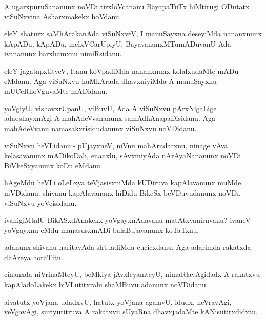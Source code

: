 \documentclass{article}
\begin{document}
\begin{mn}
A ugarxpuruSananunx noVDi tirxloVcananu BayapaTuTx hiMtirugi ODutatx
viSuNxvina Asharxmakekx hoVdanu.
\end{mn}

\begin{mn}
eleY shaturx saMhArakanAda viSuNxveV, I manuSayxna deseyiMda
nananxnunx kApADu, kApADu, melxVCarUpiyU, BayavanunxMTumADuvanU Ada
ivananunx barxhamxnu nimiRsidanu.
\end{mn}

\begin{mn}%
eleY jagatapxtityeV, Itanu koVpadiMda nananxnunx kolalxudaMte mADu
eMdanu. Aga viSuNxvu huMkArada dhavxniyiMda A manuSayxnu
mUCeRhoVguvaMte mADidanu.
\end{mn}

\begin{mn}%
yoVgiyU, vishavxrUpanU, viBuvU, Ada A viSuNxvu pArxNigaLige
adaqshayxnAgi A mahAdeVvananunx samAdhAnapaDisidanu. Aga mahAdeVvanu
namasakxrisidudanunx viSuNxvu noVDidanu.
\end{mn}

\begin{mn}%
viSuNxvu heVLidanu:- pUjayxneV, niVnu mahArudarxnu, ninage yAva
kelasavanunx mADikoDali, enanxlu, sAvxmiyAda nArAyaNananunx noVDi
BiVkeSxyanunx koDu eMdanu.
\end{mn}

\begin{mn}
hAgeMdu heVLi oLeLxya teVjasisxniMda kUDiruva kapAlavanunx muMde
niVDidanu. shivanu kapAlavanunx hiDidu BikeSx beVDuvudanunx noVDi,
viSuNxvu yoVcisidanu.
\end{mn}

\begin{mn}
ivanigiMtalU BikASxdAnakekx yoVgayxnAdavanu matAtxvaniruvanu? ivaneV
yoVgayxnu eMdu manasusxmADi balaBujavanunx koTaTxnu.
\end{mn}

\begin{mn}%
adanunx shivanu haritavAda shUladiMda cucicxdanu. Aga adarimda
rakatxda dhAreya horaTitu.
\end{mn}

\begin{mn}
cinanxda niVrinaMteyU, beMkiya jAvxleyamteyU, nimaRlavAgidadx A
rakatxvu kapAladoLakekx biVLutitxralu shaMBuvu adanunx noVDidanu.
\end{mn}

\begin{mn}
aivatutx yoVjana udadxvU, hatutx yoVjana agalavU, idudx, neVravAgi,
veVgavAgi, suriyutitruva A rakatxvu sUyaRna dhavxjadaMte kANisutitxdidxtu.
\end{mn}
\end{document}
